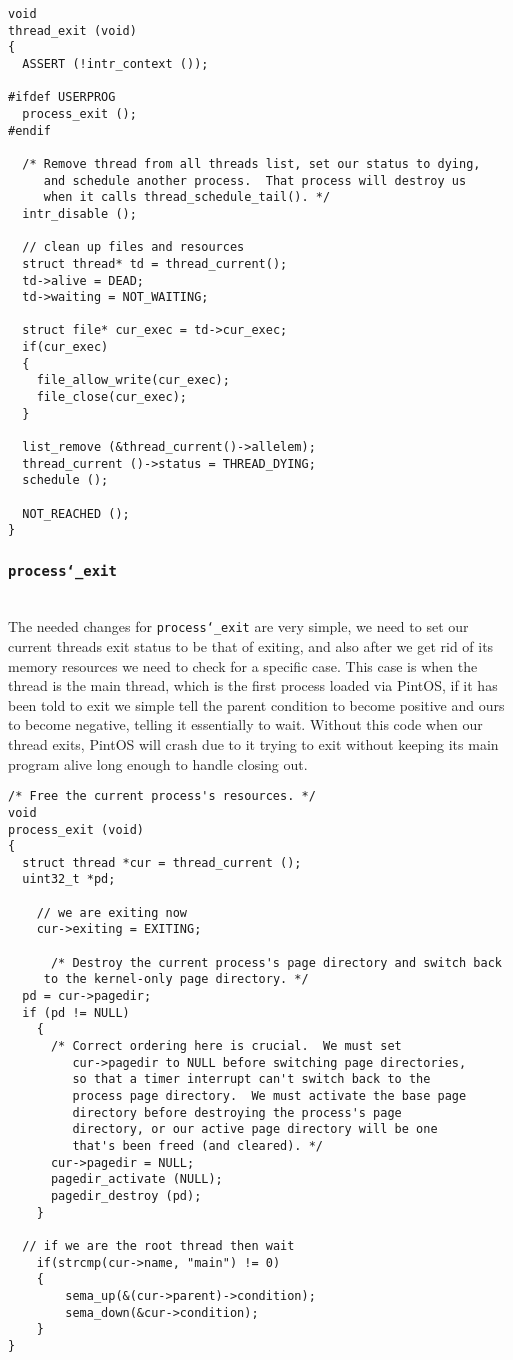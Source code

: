 \documentclass[]{article}
\begin{document}
  \lstset{language=C, tabsize=2}  
 \begin{lstlisting} 
void
thread_exit (void) 
{
  ASSERT (!intr_context ());

#ifdef USERPROG
  process_exit ();
#endif

  /* Remove thread from all threads list, set our status to dying,
     and schedule another process.  That process will destroy us
     when it calls thread_schedule_tail(). */
  intr_disable ();
  
  // clean up files and resources
  struct thread* td = thread_current();  
  td->alive = DEAD;
  td->waiting = NOT_WAITING;
  
  struct file* cur_exec = td->cur_exec;
  if(cur_exec)
  {
  	file_allow_write(cur_exec);
  	file_close(cur_exec);
  }

  list_remove (&thread_current()->allelem);
  thread_current ()->status = THREAD_DYING;
  schedule ();

  NOT_REACHED ();
}

\end{lstlisting}
\subsubsection{\texttt{process\char`_exit}} \textbf{}\\
The needed changes for \texttt{process\char`_exit} are very simple, we need to set our current threads exit status to be that of exiting, and also after we get rid of its memory resources we need to check for a specific case. This case is when the thread is the main thread, which is the first process loaded via PintOS, if it has been told to exit we simple tell the parent condition to become positive and ours to become negative, telling it essentially to wait. Without this code when our thread exits, PintOS will crash due to it trying to exit without keeping its main program alive long enough to handle closing out.
  \lstset{language=C, tabsize=2}  
 \begin{lstlisting} 
/* Free the current process's resources. */
void
process_exit (void)
{
  struct thread *cur = thread_current ();
  uint32_t *pd;

	// we are exiting now
	cur->exiting = EXITING;

	  /* Destroy the current process's page directory and switch back
     to the kernel-only page directory. */
  pd = cur->pagedir;
  if (pd != NULL) 
    {
      /* Correct ordering here is crucial.  We must set
         cur->pagedir to NULL before switching page directories,
         so that a timer interrupt can't switch back to the
         process page directory.  We must activate the base page
         directory before destroying the process's page
         directory, or our active page directory will be one
         that's been freed (and cleared). */
      cur->pagedir = NULL;
      pagedir_activate (NULL);
      pagedir_destroy (pd);
    }
    
  // if we are the root thread then wait  
	if(strcmp(cur->name, "main") != 0)
	{
		sema_up(&(cur->parent)->condition);
		sema_down(&cur->condition);
	}
} 
 \end{lstlisting}
 \newpage
\end{document}
